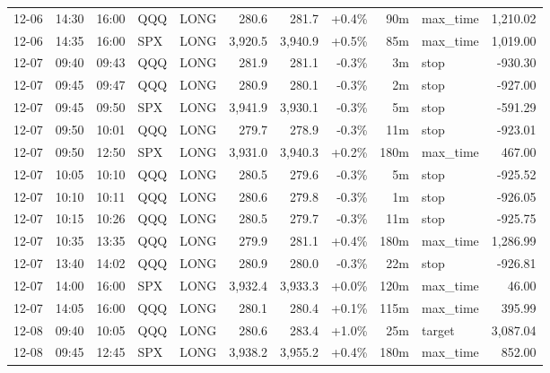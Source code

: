 \documentclass[11pt,a4paper,twoside]{article}
\begin{document}
\begin{center}
\begin{longtable}{>{\color{txtmain}}l l l l l r r r r >{\color{txtmain}}l r}
12-06 & 14:30 & 16:00 & QQQ & LONG & 280.6 & 281.7 & \textcolor{wingreen}{+0.4\%} & 90m & max\_time & \textcolor{wingreen}{1,210.02} \\
12-06 & 14:35 & 16:00 & SPX & LONG & 3,920.5 & 3,940.9 & \textcolor{wingreen}{+0.5\%} & 85m & max\_time & \textcolor{wingreen}{1,019.00} \\
12-07 & 09:40 & 09:43 & QQQ & LONG & 281.9 & 281.1 & \textcolor{lossred}{-0.3\%} & 3m & stop & \textcolor{lossred}{-930.30} \\
12-07 & 09:45 & 09:47 & QQQ & LONG & 280.9 & 280.1 & \textcolor{lossred}{-0.3\%} & 2m & stop & \textcolor{lossred}{-927.00} \\
12-07 & 09:45 & 09:50 & SPX & LONG & 3,941.9 & 3,930.1 & \textcolor{lossred}{-0.3\%} & 5m & stop & \textcolor{lossred}{-591.29} \\
12-07 & 09:50 & 10:01 & QQQ & LONG & 279.7 & 278.9 & \textcolor{lossred}{-0.3\%} & 11m & stop & \textcolor{lossred}{-923.01} \\
12-07 & 09:50 & 12:50 & SPX & LONG & 3,931.0 & 3,940.3 & \textcolor{wingreen}{+0.2\%} & 180m & max\_time & \textcolor{wingreen}{467.00} \\
12-07 & 10:05 & 10:10 & QQQ & LONG & 280.5 & 279.6 & \textcolor{lossred}{-0.3\%} & 5m & stop & \textcolor{lossred}{-925.52} \\
12-07 & 10:10 & 10:11 & QQQ & LONG & 280.6 & 279.8 & \textcolor{lossred}{-0.3\%} & 1m & stop & \textcolor{lossred}{-926.05} \\
12-07 & 10:15 & 10:26 & QQQ & LONG & 280.5 & 279.7 & \textcolor{lossred}{-0.3\%} & 11m & stop & \textcolor{lossred}{-925.75} \\
12-07 & 10:35 & 13:35 & QQQ & LONG & 279.9 & 281.1 & \textcolor{wingreen}{+0.4\%} & 180m & max\_time & \textcolor{wingreen}{1,286.99} \\
12-07 & 13:40 & 14:02 & QQQ & LONG & 280.9 & 280.0 & \textcolor{lossred}{-0.3\%} & 22m & stop & \textcolor{lossred}{-926.81} \\
12-07 & 14:00 & 16:00 & SPX & LONG & 3,932.4 & 3,933.3 & \textcolor{wingreen}{+0.0\%} & 120m & max\_time & \textcolor{wingreen}{46.00} \\
12-07 & 14:05 & 16:00 & QQQ & LONG & 280.1 & 280.4 & \textcolor{wingreen}{+0.1\%} & 115m & max\_time & \textcolor{wingreen}{395.99} \\
12-08 & 09:40 & 10:05 & QQQ & LONG & 280.6 & 283.4 & \textcolor{wingreen}{+1.0\%} & 25m & target & \textcolor{wingreen}{3,087.04} \\
12-08 & 09:45 & 12:45 & SPX & LONG & 3,938.2 & 3,955.2 & \textcolor{wingreen}{+0.4\%} & 180m & max\_time & \textcolor{wingreen}{852.00} \\

\end{longtable}
\end{center}
\end{document}
